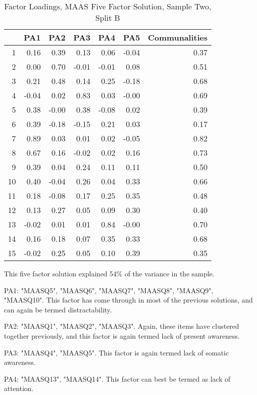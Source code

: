 \documentclass{article}
\begin{document}
\begin{table}[ht]
\centering
\begin{tabular}{rrrrrrr}
  \hline
 & PA1 & PA2 & PA3 & PA4 & PA5 & Communalities \\ 
  \hline
1 & 0.16 & 0.39 & 0.13 & 0.06 & -0.04 & 0.37 \\ 
  2 & 0.00 & 0.70 & -0.01 & -0.01 & 0.08 & 0.51 \\ 
  3 & 0.21 & 0.48 & 0.14 & 0.25 & -0.18 & 0.68 \\ 
  4 & -0.04 & 0.02 & 0.83 & 0.03 & -0.00 & 0.69 \\ 
  5 & 0.38 & -0.00 & 0.38 & -0.08 & 0.02 & 0.39 \\ 
  6 & 0.39 & -0.18 & -0.15 & 0.21 & 0.03 & 0.17 \\ 
  7 & 0.89 & 0.03 & 0.01 & 0.02 & -0.05 & 0.82 \\ 
  8 & 0.67 & 0.16 & -0.02 & 0.02 & 0.16 & 0.73 \\ 
  9 & 0.39 & 0.04 & 0.24 & 0.11 & 0.11 & 0.50 \\ 
  10 & 0.40 & -0.04 & 0.26 & 0.04 & 0.33 & 0.66 \\ 
  11 & 0.18 & -0.08 & 0.17 & 0.25 & 0.35 & 0.48 \\ 
  12 & 0.13 & 0.27 & 0.05 & 0.09 & 0.30 & 0.40 \\ 
  13 & -0.02 & 0.01 & 0.01 & 0.84 & -0.00 & 0.70 \\ 
  14 & 0.16 & 0.18 & 0.07 & 0.35 & 0.33 & 0.68 \\ 
  15 & -0.02 & 0.25 & 0.05 & 0.10 & 0.39 & 0.35 \\ 
   \hline
\end{tabular}
\caption{Factor Loadings, MAAS Five Factor Solution, Sample Two, Split B} 
\label{tab:tcq2bmaasfact5}
\end{table}This five factor solution explained 54\% of the variance in the sample.

PA1: "MAASQ5",  "MAASQ6",  "MAASQ7",  "MAASQ8",  "MAASQ9",  "MAASQ10".  This factor has come through in most of the previous solutions, and can again be termed distractability.

PA2: "MAASQ1", "MAASQ2", "MAASQ3".  Again, these items have clustered together previously, and this factor is again termed lack of present awareness.

PA3: "MAASQ4", "MAASQ5".  This factor is again termed lack of somatic awareness.

PA4: "MAASQ13", "MAASQ14".  This factor can best be termed as lack of attention.
\end{document}
